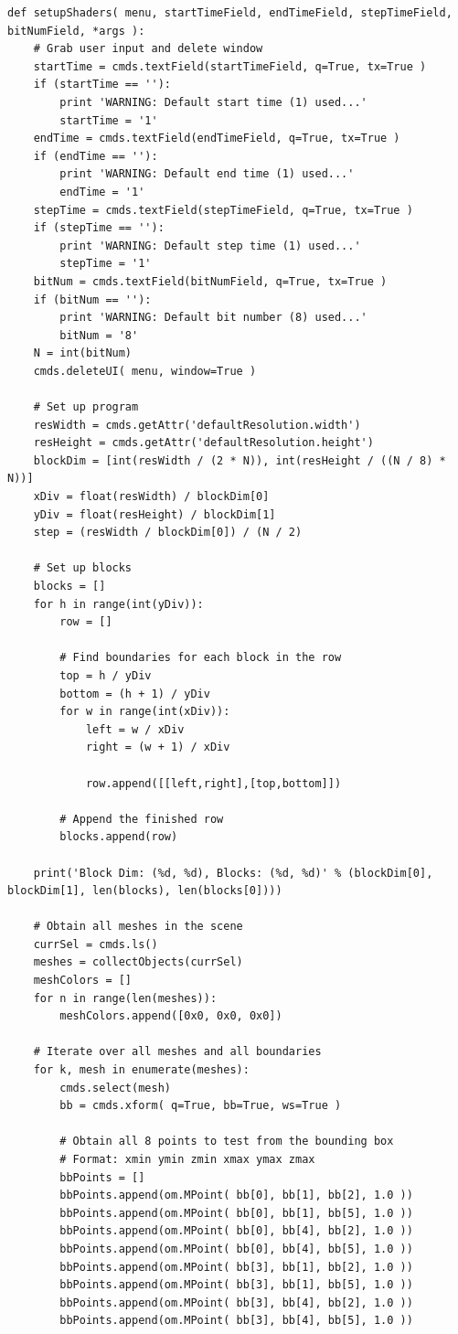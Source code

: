 \documentclass[conference]{IEEEtran}
\begin{document}
{{\begin{verbatim}
def setupShaders( menu, startTimeField, endTimeField, stepTimeField, bitNumField, *args ):
    # Grab user input and delete window
    startTime = cmds.textField(startTimeField, q=True, tx=True )
    if (startTime == ''):
        print 'WARNING: Default start time (1) used...'
        startTime = '1'
    endTime = cmds.textField(endTimeField, q=True, tx=True )
    if (endTime == ''):
        print 'WARNING: Default end time (1) used...'
        endTime = '1'
    stepTime = cmds.textField(stepTimeField, q=True, tx=True )
    if (stepTime == ''):
        print 'WARNING: Default step time (1) used...'
        stepTime = '1'
    bitNum = cmds.textField(bitNumField, q=True, tx=True )
    if (bitNum == ''):
        print 'WARNING: Default bit number (8) used...'
        bitNum = '8'
    N = int(bitNum)
    cmds.deleteUI( menu, window=True )
    
    # Set up program
    resWidth = cmds.getAttr('defaultResolution.width')
    resHeight = cmds.getAttr('defaultResolution.height')
    blockDim = [int(resWidth / (2 * N)), int(resHeight / ((N / 8) * N))]
    xDiv = float(resWidth) / blockDim[0]
    yDiv = float(resHeight) / blockDim[1]
    step = (resWidth / blockDim[0]) / (N / 2)
        
    # Set up blocks
    blocks = []
    for h in range(int(yDiv)):
        row = []
        
        # Find boundaries for each block in the row
        top = h / yDiv
        bottom = (h + 1) / yDiv
        for w in range(int(xDiv)):
            left = w / xDiv
            right = (w + 1) / xDiv
            
            row.append([[left,right],[top,bottom]])
            
        # Append the finished row
        blocks.append(row)
            
    print('Block Dim: (%d, %d), Blocks: (%d, %d)' % (blockDim[0], blockDim[1], len(blocks), len(blocks[0])))
    
    # Obtain all meshes in the scene
    currSel = cmds.ls()
    meshes = collectObjects(currSel)
    meshColors = []
    for n in range(len(meshes)):
        meshColors.append([0x0, 0x0, 0x0])
    
    # Iterate over all meshes and all boundaries
    for k, mesh in enumerate(meshes):
        cmds.select(mesh)
        bb = cmds.xform( q=True, bb=True, ws=True )
        
        # Obtain all 8 points to test from the bounding box
        # Format: xmin ymin zmin xmax ymax zmax
        bbPoints = []
        bbPoints.append(om.MPoint( bb[0], bb[1], bb[2], 1.0 ))
        bbPoints.append(om.MPoint( bb[0], bb[1], bb[5], 1.0 ))
        bbPoints.append(om.MPoint( bb[0], bb[4], bb[2], 1.0 ))
        bbPoints.append(om.MPoint( bb[0], bb[4], bb[5], 1.0 ))
        bbPoints.append(om.MPoint( bb[3], bb[1], bb[2], 1.0 ))
        bbPoints.append(om.MPoint( bb[3], bb[1], bb[5], 1.0 ))
        bbPoints.append(om.MPoint( bb[3], bb[4], bb[2], 1.0 ))
        bbPoints.append(om.MPoint( bb[3], bb[4], bb[5], 1.0 ))
        

\end{verbatim}}}
\end{document}
